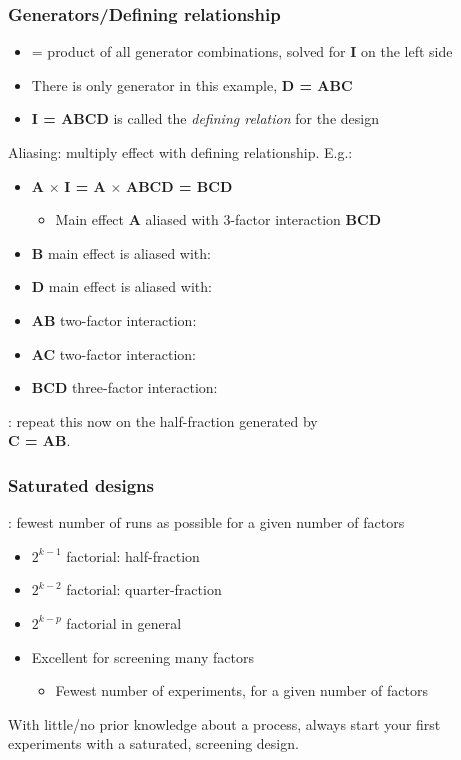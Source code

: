 \begin{frame}\frametitle{Generators/Defining relationship}
	\begin{itemize}
		\item	{\color{purple}{Defining relationship}} = product of all generator combinations, solved for \textbf{I} on the left side
		\item	There is only generator in this example, \textbf{D = ABC}
		\item	\textbf{I = ABCD} is called the \emph{defining relation} for the design
	\end{itemize}

	Aliasing: multiply effect with defining relationship. E.g.:
	\begin{itemize}
		\item	\textbf{A} $\times$ \textbf{I = A} $\times$ \textbf{ABCD = BCD}
		\begin{itemize}
			\item	Main effect \textbf{A} aliased with 3-factor interaction \textbf{BCD}
		\end{itemize}
		\item	\textbf{B} main effect is aliased with:
		\item	\textbf{D} main effect is aliased with:
		\item	\textbf{AB} two-factor interaction:
		\item	\textbf{AC} two-factor interaction:
		\item	\textbf{BCD} three-factor interaction:
	\end{itemize}
	{\color{myOrange}{Homework}}: repeat this now on the half-fraction generated by\\ \textbf{C = AB}.
\end{frame}

\begin{frame}\frametitle{Saturated designs}

	{\color{purple}{Saturated design}}: fewest number of runs as possible for a given number of factors
	\begin{itemize}
		\item	$2^{k-1}$ factorial: half-fraction
		\item	$2^{k-2}$ factorial: quarter-fraction
		\item	$2^{k-p}$ factorial in general
	\end{itemize}
	\begin{itemize}
		\item	Excellent for screening many factors
		\begin{itemize}
			\item	Fewest number of experiments, for a given number of factors
		\end{itemize}
	\end{itemize}
	\begin{exampleblock}{}
		With little/no prior knowledge about a process, always start your first experiments with a saturated, screening design.
	\end{exampleblock}
	{\color{myOrange}{This gives you the greatest value for your experimental budget.}}
\end{frame}

